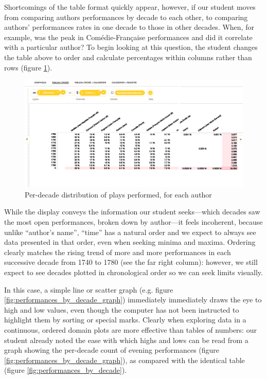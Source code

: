 \documentclass[	DIV=calc,%
							paper=a4,%
							fontsize=11pt,%
							twocolumn]{scrartcl}	 					%
\begin{document}
Shortcomings of the table format quickly appear, however, if our student moves from comparing authors performances by decade to each other, to comparing authors’ performances rates in one decade to those in other decades.  When, for example, was the peak in Comédie-Française performances and did it correlate with a particular author?  To begin looking at this question, the student changes the table above to order and calculate percentages within columns rather than rows (figure \ref{fig:stitched-decades-table}).

\begin{figure}
  \centering
	\includegraphics[width=7in]{steps/stitched-decades-table.png}
	\caption{\color{red}Per-decade distribution of plays performed, for each author}
	\label{fig:stitched-decades-table}
\end{figure}

While the display conveys the information our student seeks—which decades saw the most open performances, broken down by author—it feels incoherent, because unlike ``author’s name'', ``time'' has a natural order and we expect to always see data presented in that order, even when seeking minima and maxima.  Ordering clearly matches the rising trend of more and more performances in each successive decade from 1740 to 1780 (see the far right column): however, we still expect to see decades plotted in chronological order so we can seek limits visually.

In this case, a simple line or scatter graph (e.g. figure \ref{fig:performances_by_decade_graph}) immediately immediately draws the eye to high and low values, even though the computer has not been instructed to highlight them by sorting or special marks.  Clearly when exploring data in a continuous, ordered domain plots are more effective than tables of numbers: our student already noted the ease with which highs and lows can be read from a graph showing the per-decade count of evening performances (figure \ref{fig:performances_by_decade_graph}), as compared with the identical table (figure \ref{fig:performances_by_decade}).
\end{document}
